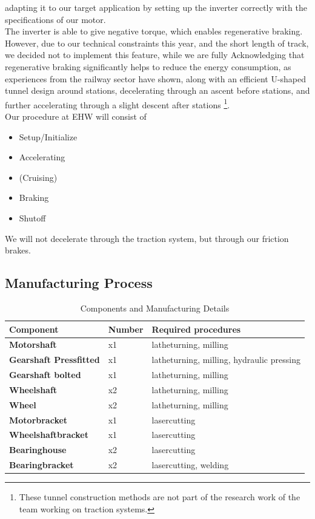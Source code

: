 adapting it to our target application by setting up the inverter correctly with the specifications of our motor. \\
The inverter is able to give negative torque, which enables regenerative braking. However, due to our technical constraints this year, and the short length of track, we decided not to implement this feature, while we are fully Acknowledging that regenerative braking significantly helps to reduce the energy consumption, as experiences from the railway sector have shown, along with an efficient U-shaped tunnel design around stations, decelerating through an ascent before stations, and further accelerating through a slight descent after stations \footnote{These tunnel construction methods are not part of the research work of the team working on traction systems.}. \\
Our procedure at EHW will consist of \begin{itemize}
  \item Setup/Initialize
  \item Accelerating
  \item (Cruising)
  \item Braking
  \item Shutoff
\end{itemize}
We will not decelerate through the traction system, but through our friction brakes.

\subsection{Manufacturing Process}
\begin{table}[H]
\centering
\begin{adjustbox}{width=\textwidth}
\begin{tabular}{|>{\bfseries}m{5cm}|m{}|m{8cm}|}
\hline
Component & Number & Required procedures \\
\hline
Motorshaft & x1 & latheturning, milling \\
\hline
Gearshaft Pressfitted & x1 & latheturning, milling, hydraulic pressing \\
\hline
Gearshaft bolted & x1 & latheturning, milling \\
\hline
Wheelshaft & x2 & latheturning, milling \\
\hline
Wheel & x2 & latheturning, milling \\
\hline
Motorbracket & x1 & lasercutting  \\
\hline
Wheelshaftbracket & x1 & lasercutting  \\
\hline
Bearinghouse & x2 & lasercutting  \\
\hline
Bearingbracket & x2 & lasercutting, welding \\
\hline
\end{tabular}
\end{adjustbox}
\caption{Components and Manufacturing Details}
\label{table:components}
\end{table}

